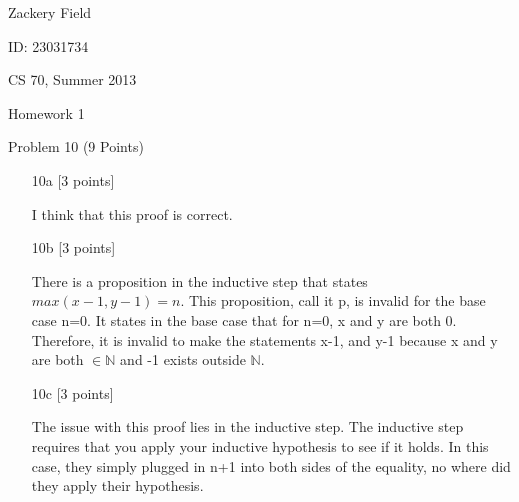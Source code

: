 \documentclass[11pt,letterpaper]{article}
\begin{document}
Zackery Field

ID: 23031734

CS 70, Summer 2013

Homework 1 

Problem 10 (9 Points)
\bigskip

\begin{enumerate}

\item[10a] [3 points] 

I think that this proof is correct.

\item[10b] [3 points]

There is a proposition in the inductive step that states $max(x-1,y-1) = n$. This proposition, call it p, is invalid for the base case n=0. It states in the base case that for n=0, x and y are both 0. Therefore, it is invalid to make the statements x-1, and y-1 because x and y are both $\in \mathbb{N}$ and -1 exists outside $\mathbb{N}$.

\item[10c] [3 points]

The issue with this proof lies in the inductive step. The inductive step requires that you apply your inductive hypothesis to see if it holds. In this case, they simply plugged in n+1 into both sides of the equality, no where did they apply their hypothesis.

\end{enumerate}
\end{document}
